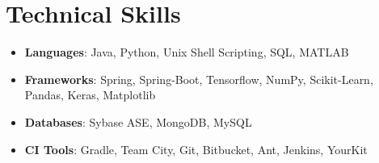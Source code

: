 \documentclass[letterpaper,11pt]{article}
\newcommand{\resumeItem}[2]{
  \item\small{
    \textbf{#1}{: #2 \vspace{-2pt}}
  }
}
\newcommand{\resumeSubItem}[2]{\resumeItem{#1}{#2}\vspace{-4pt}}
\newcommand{\resumeSubHeadingListStart}{\begin{itemize}[leftmargin=*]}
\newcommand{\resumeSubHeadingListEnd}{\end{itemize}}
\begin{document}
\section{Technical Skills}
 \resumeSubHeadingListStart
 \resumeSubItem{Languages}{Java, Python, Unix Shell Scripting, SQL, MATLAB}
 \resumeSubItem{Frameworks}{Spring, Spring-Boot, Tensorflow, NumPy, Scikit-Learn, Pandas, Keras, Matplotlib}
 \resumeSubItem{Databases}{Sybase ASE, MongoDB, MySQL}
 \resumeSubItem{CI Tools}{Gradle, Team City, Git, Bitbucket, Ant, Jenkins, YourKit}
 \resumeSubHeadingListEnd
\end{document}
